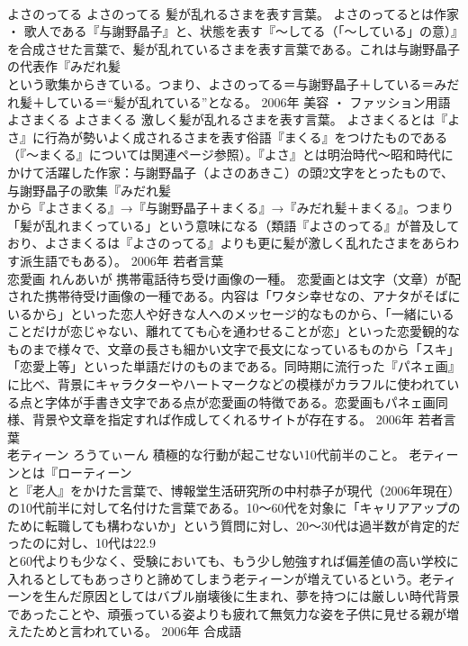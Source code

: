 \documentclass[8pt]{extreport}
\begin{document}
\begin{CJK}{UTF8}{min}
\\	よさのってる	よさのってる	髪が乱れるさまを表す言葉。	よさのってるとは作家 ・ 歌人である『与謝野晶子』と、状態を表す『～してる（「～している」の意）』を合成させた言葉で、髪が乱れているさまを表す言葉である。これは与謝野晶子の代表作『みだれ髪 
\\	という歌集からきている。つまり、よさのってる＝与謝野晶子＋している＝みだれ髪＋している＝“髪が乱れている”となる。	2006年	美容 ・ ファッション用語	
\\	よさまくる	よさまくる	激しく髪が乱れるさまを表す言葉。	よさまくるとは『よさ』に行為が勢いよく成されるさまを表す俗語『まくる』をつけたものである（『～まくる』については関連ページ参照）。『よさ』とは明治時代～昭和時代にかけて活躍した作家：与謝野晶子（よさのあきこ）の頭2文字をとったもので、与謝野晶子の歌集『みだれ髪 
\\	から『よさまくる』→『与謝野晶子＋まくる』→『みだれ髪＋まくる』。つまり「髪が乱れまくっている」という意味になる（類語『よさのってる』が普及しており、よさまくるは『よさのってる』よりも更に髪が激しく乱れたさまをあらわす派生語でもある）。	2006年	若者言葉	
\\	恋愛画	れんあいが	携帯電話待ち受け画像の一種。	恋愛画とは文字（文章）が配された携帯待受け画像の一種である。内容は「ワタシ幸せなの、アナタがそばにいるから」といった恋人や好きな人へのメッセージ的なものから、「一緒にいることだけが恋じゃない、離れてても心を通わせることが恋」といった恋愛観的なものまで様々で、文章の長さも細かい文字で長文になっているものから「スキ」「恋愛上等」といった単語だけのものまである。同時期に流行った『パネェ画』に比べ、背景にキャラクターやハートマークなどの模様がカラフルに使われている点と字体が手書き文字である点が恋愛画の特徴である。恋愛画もパネェ画同様、背景や文章を指定すれば作成してくれるサイトが存在する。	2006年	若者言葉	
\\	老ティーン	ろうてぃーん	積極的な行動が起こせない10代前半のこと。	老ティーンとは『ローティーン
\\	と『老人』をかけた言葉で、博報堂生活研究所の中村恭子が現代（2006年現在）の10代前半に対して名付けた言葉である。10～60代を対象に「キャリアアップのために転職しても構わないか」という質問に対し、20～30代は過半数が肯定的だったのに対し、10代は22.9
\\	と60代よりも少なく、受験においても、もう少し勉強すれば偏差値の高い学校に入れるとしてもあっさりと諦めてしまう老ティーンが増えているという。老ティーンを生んだ原因としてはバブル崩壊後に生まれ、夢を持つには厳しい時代背景であったことや、頑張っている姿よりも疲れて無気力な姿を子供に見せる親が増えたためと言われている。	2006年	合成語	

\end{CJK}
\end{document}
